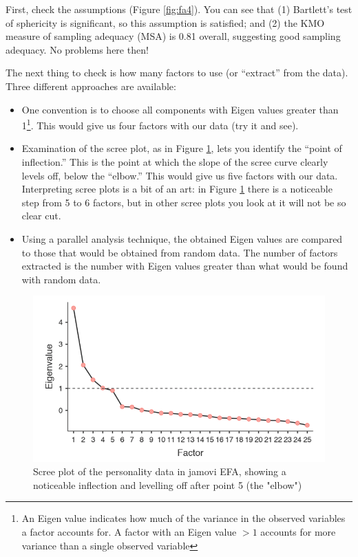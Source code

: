 \documentclass[
]{book}
\providecommand{\tightlist}{%
  \setlength{\itemsep}{0pt}\setlength{\parskip}{0pt}}
\begin{document}
First, check the assumptions (Figure \ref{fig:fa4}). You can see that (1) Bartlett's test of sphericity is significant, so this assumption is satisfied; and (2) the KMO measure of sampling adequacy (MSA) is 0.81 overall, suggesting good sampling adequacy. No problems here then!

The next thing to check is how many factors to use (or ``extract'' from the data). Three different approaches are available:

\begin{itemize}
\tightlist
\item
  One convention is to choose all components with Eigen values greater than 1\footnote{An Eigen value indicates how much of the variance in the observed variables a factor accounts for. A factor with an Eigen value \(>1\) accounts for more variance than a single observed variable}. This would give us four factors with our data (try it and see).
\item
  Examination of the scree plot, as in Figure \ref{fig:fa5}, lets you identify the ``point of inflection.'' This is the point at which the slope of the scree curve clearly levels off, below the ``elbow.'' This would give us five factors with our data. Interpreting scree plots is a bit of an art: in Figure \ref{fig:fa5} there is a noticeable step from 5 to 6 factors, but in other scree plots you look at it will not be so clear cut.
\item
  Using a parallel analysis technique, the obtained Eigen values are compared to those that would be obtained from random data. The number of factors extracted is the number with Eigen values greater than what would be found with random data.
\end{itemize}

\begin{figure}

{\centering \includegraphics[width=1\linewidth]{img/factoranalysis/fa5} 

}

\caption{Scree plot of the personality data in jamovi EFA, showing a noticeable inflection and levelling off after point 5 (the "elbow")}\label{fig:fa5}
\end{figure}
\end{document}
